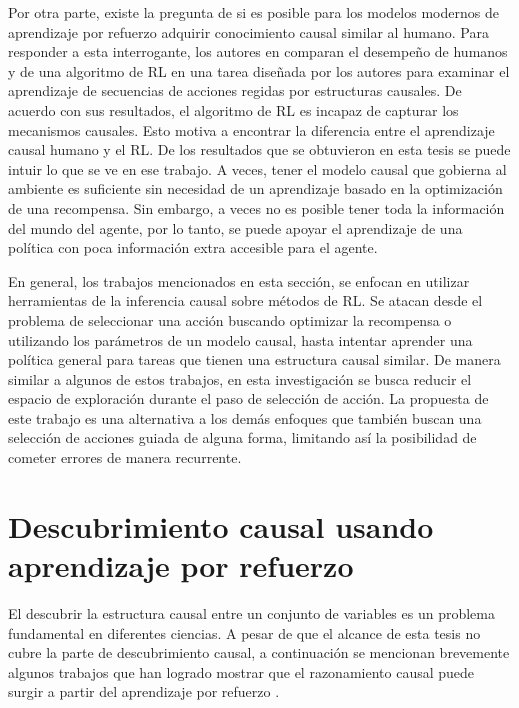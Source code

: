 Por otra parte, existe la pregunta de si es posible para los modelos modernos de aprendizaje por refuerzo adquirir conocimiento causal similar al humano. Para responder a esta interrogante,  los autores en \cite{edmonds2018human} comparan el desempeño de humanos y de una algoritmo de RL en una tarea diseñada por los autores para examinar el aprendizaje de secuencias de acciones regidas por estructuras causales.  De acuerdo con sus resultados, el algoritmo de RL es incapaz de capturar los mecanismos causales. Esto motiva a encontrar la diferencia entre el aprendizaje causal humano y el RL. De los resultados que se obtuvieron en esta tesis se puede intuir lo que se ve en ese trabajo. A veces, tener el modelo causal que gobierna al ambiente es suficiente sin necesidad de un aprendizaje basado en la optimización de una recompensa. Sin embargo, a veces no es posible 
tener toda la información del mundo del agente, por lo tanto, 
se puede apoyar el aprendizaje de una política con poca información
extra accesible para el agente.

En general, 
los trabajos mencionados en esta sección, se enfocan en 
utilizar herramientas de la inferencia causal sobre
métodos de RL.
Se atacan desde el problema
de seleccionar una acción buscando optimizar la recompensa
o utilizando los parámetros de un modelo causal, hasta 
intentar aprender una política general para tareas que tienen
una estructura causal similar.
De manera similar a algunos de estos trabajos, en esta
investigación se busca reducir el espacio de exploración durante el paso de selección de acción. La propuesta de este trabajo
es una alternativa a los demás enfoques que también buscan
una selección de acciones guiada de alguna forma, limitando así la posibilidad de cometer errores de manera recurrente.

\section{Descubrimiento causal usando aprendizaje por refuerzo}

El descubrir la estructura causal entre un conjunto de variables es un problema
fundamental en diferentes ciencias. A pesar de que 
el alcance de esta tesis no cubre la parte de descubrimiento causal, a continuación se mencionan brevemente algunos trabajos 
que han logrado mostrar que el razonamiento causal puede surgir a partir del aprendizaje por refuerzo \cite{dasgupta2019causal, madumal2019explainable, zhu2019causal}. 


